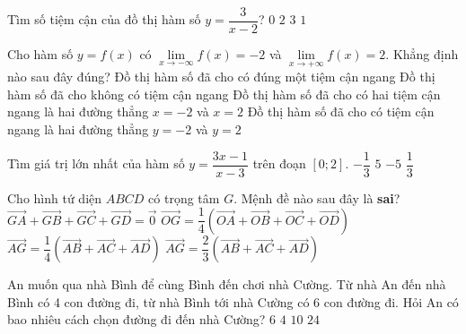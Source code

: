 \begin{ex}%
	Tìm số tiệm cận của đồ thị hàm số $y=\dfrac{3}{x-2}$?
	\choice
	{$0$}
	{\True $2$}
	{$3$}
	{$1$}
\end{ex}
\begin{ex}%
	Cho hàm số $y=f(x)$ có $\lim\limits_{x \to -\infty}f(x)=-2$ và $\lim\limits_{x \to +\infty}f(x)=2$. Khẳng định nào sau đây đúng?
	\choice
	{Đồ thị hàm số đã cho có đúng một tiệm cận ngang}
	{Đồ thị hàm số đã cho không có tiệm cận ngang}
	{Đồ thị hàm số đã cho có hai tiệm cận ngang là hai đường thẳng $x =- 2$ và $x = 2$}
	{\True Đồ thị hàm số đã cho có tiệm cận ngang là hai đường thẳng $y = -2$ và $y = 2$}
\end{ex}
\begin{ex}%
Tìm giá trị lớn nhất của hàm số $y=\dfrac{3x-1}{x-3}$ trên đoạn $[0;2]$.
	\choice
	{$-\dfrac{1}{3}$}
	{$5$}
	{$-5$}
	{\True $\dfrac{1}{3}$}
\end{ex}
\begin{ex}%
	Cho hình tứ diện $ABCD$ có trọng tâm $G$. Mệnh đề nào sau đây là \textbf{sai}?
	\choice
	{$\vec{GA}+\vec{GB}+\vec{GC}+\vec{GD}=\vec{0}$}
	{$\vec{OG}=\dfrac{1}{4}\left(\vec{OA}+\vec{OB}+\vec{OC}+\vec{OD}\right)$}
	{$\vec{AG}=\dfrac{1}{4}\left(\vec{AB}+\vec{AC}+\vec{AD}\right)$}
	{\True $\vec{AG}=\dfrac{2}{3 }\left(\vec{AB}+\vec{AC}+\vec{AD}\right)$}
\end{ex}
\begin{ex}%
An muốn qua nhà Bình để cùng Bình đến chơi nhà Cường. Từ nhà An đến nhà Bình có 4 con đường đi, từ nhà Bình tới nhà Cường có 6 con đường đi. Hỏi An có bao nhiêu cách chọn đường đi đến nhà Cường?
	\choice
	{$6$}
	{$4$}
	{$10$}
	{\True $24$}
\end{ex}
